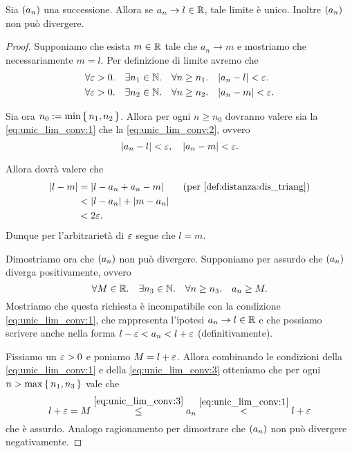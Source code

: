 \begin{lemma} \label{lem:unic_lim_conv}
    Sia $\seqn*{a}$ una successione. Allora se $a_n \to l \in \R$, tale limite è unico. Inoltre $\seqn*{a}$ non può divergere.
\end{lemma}
\begin{proof}
    Supponiamo che esista $m \in \R$ tale che $a_n \to m$ e mostriamo che necessariamente $m = l$. Per definizione di limite avremo che \begin{align}
        &\forall \eps > 0. \quad \exists n_1 \in \N. \quad \forall n \geq n_1. \quad \abs*{a_n - l} < \eps. \label{eq:unic_lim_conv:1}\\
        &\forall \eps > 0. \quad \exists n_2 \in \N. \quad \forall n \geq n_2. \quad \abs*{a_n - m} < \eps. \label{eq:unic_lim_conv:2}
    \end{align}

    Sia ora $n_0 \deq \min \set{n_1, n_2}$. Allora per ogni $n \geq n_0$ dovranno valere sia la \eqref{eq:unic_lim_conv:1} che la \eqref{eq:unic_lim_conv:2}, ovvero \[
        \abs*{a_n - l} < \eps, \quad  \abs*{a_n - m} < \eps.
    \]

    Allora dovrà valere che \begin{align*}
        \abs*{l - m} &= \abs*{l - a_n + a_n - m} \tag{per \ref{def:distanza:dis_triang}}\\
        &< \abs*{l - a_n} + \abs*{m - a_n}\\
        &< 2\eps.
    \end{align*}
    Dunque per l'arbitrarietà di $\eps$ segue che $l = m$.

    Dimostriamo ora che $\seqn*{a}$ non può divergere. Supponiamo per assurdo che $\seqn*{a}$ diverga positivamente, ovvero \begin{equation}
        \label{eq:unic_lim_conv:3} \forall M \in \R. \quad \exists n_3 \in \N. \quad \forall n \geq n_3. \quad a_n \geq M.
    \end{equation} Mostriamo che questa richiesta è incompatibile con la condizione \eqref{eq:unic_lim_conv:1}, che rappresenta l'ipotesi $a_n \to l \in \R$ e che possiamo scrivere anche nella forma $l - \eps < a_n < l + \eps$ (definitivamente).

    Fissiamo un $\eps > 0$ e poniamo $M = l + \eps$. Allora combinando le condizioni della \eqref{eq:unic_lim_conv:1} e della \eqref{eq:unic_lim_conv:3} otteniamo che per ogni $n > \max \set{n_1, n_3}$ vale che \[
        l + \eps = M \stackrel{\eqref{eq:unic_lim_conv:3}}{\leq} a_n \stackrel{\eqref{eq:unic_lim_conv:1}}{<} l + \eps   
    \] che è assurdo. Analogo ragionamento per dimostrare che $\seqn*{a}$ non può divergere negativamente.
\end{proof}

